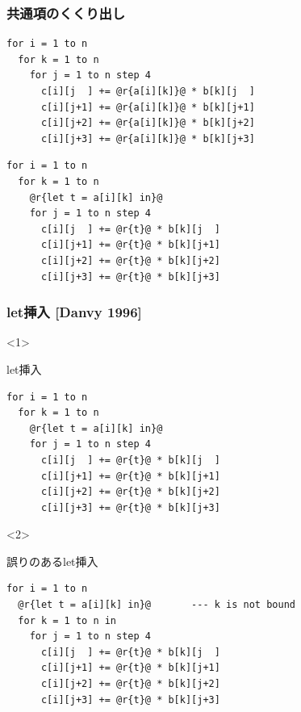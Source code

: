 \documentclass[dvipdfmx,cjk,xcolor=dvipsnames,envcountsect,notheorems,12pt]{beamer}
\theoremstyle{definition}
\begin{document}
\begin{frame}[fragile]
  \frametitle{共通項のくくり出し}
\begin{lstlisting}
for i = 1 to n
  for k = 1 to n
    for j = 1 to n step 4
      c[i][j  ] += @r{a[i][k]}@ * b[k][j  ]
      c[i][j+1] += @r{a[i][k]}@ * b[k][j+1]
      c[i][j+2] += @r{a[i][k]}@ * b[k][j+2]
      c[i][j+3] += @r{a[i][k]}@ * b[k][j+3]
\end{lstlisting}
  \pause
\begin{lstlisting}
for i = 1 to n
  for k = 1 to n
    @r{let t = a[i][k] in}@
    for j = 1 to n step 4
      c[i][j  ] += @r{t}@ * b[k][j  ]
      c[i][j+1] += @r{t}@ * b[k][j+1]
      c[i][j+2] += @r{t}@ * b[k][j+2]
      c[i][j+3] += @r{t}@ * b[k][j+3]
\end{lstlisting}
\end{frame}

\begin{frame}[fragile]
  \frametitle{let挿入 [Danvy 1996]}

  \begin{onlyenv}<1>
    \begin{exampleblock}{let挿入}
\begin{lstlisting}
for i = 1 to n
  for k = 1 to n
    @r{let t = a[i][k] in}@
    for j = 1 to n step 4
      c[i][j  ] += @r{t}@ * b[k][j  ]
      c[i][j+1] += @r{t}@ * b[k][j+1]
      c[i][j+2] += @r{t}@ * b[k][j+2]
      c[i][j+3] += @r{t}@ * b[k][j+3]
\end{lstlisting}
    \end{exampleblock}
  \end{onlyenv}

  \begin{onlyenv}<2>
    \begin{exampleblock}{誤りのあるlet挿入}
\begin{lstlisting}
for i = 1 to n
  @r{let t = a[i][k] in}@       --- k is not bound
  for k = 1 to n in
    for j = 1 to n step 4
      c[i][j  ] += @r{t}@ * b[k][j  ]
      c[i][j+1] += @r{t}@ * b[k][j+1]
      c[i][j+2] += @r{t}@ * b[k][j+2]
      c[i][j+3] += @r{t}@ * b[k][j+3]
\end{lstlisting}
    \end{exampleblock}
  \end{onlyenv}
\end{frame}

\end{document}
